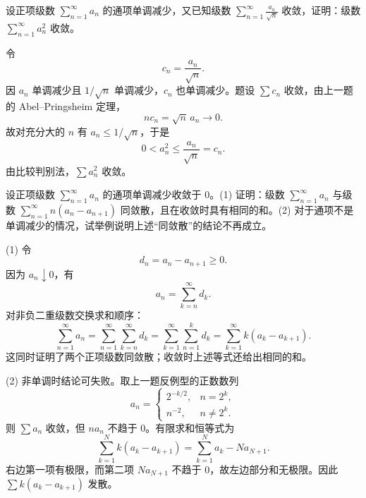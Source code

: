 \begin{xreferenceproblem}[3]
设正项级数 $\sum_{n=1}^{\infty}a_n$ 的通项单调减少，又已知级数 $\sum_{n=1}^{\infty}\frac{a_n}{\sqrt n}$ 收敛，证明：级数 $\sum_{n=1}^{\infty}a_n^2$ 收敛。
\end{xreferenceproblem}
\begin{xsolution}
令
\[
 c_n=\frac{a_n}{\sqrt n}.
\]
因 $a_n$ 单调减少且 $1/\sqrt n$ 单调减少，$c_n$ 也单调减少。题设 $\sum c_n$ 收敛，由上一题的 Abel--Pringsheim 定理，
\[
 nc_n=\sqrt n\,a_n\longrightarrow0.
\]
故对充分大的 $n$ 有 $a_n\leq1/\sqrt n$，于是
\[
 0<a_n^2\leq\frac{a_n}{\sqrt n}=c_n.
\]
由比较判别法，$\sum a_n^2$ 收敛。
\end{xsolution}


\begin{xreferenceproblem}[4]
设正项级数 $\sum_{n=1}^{\infty}a_n$ 的通项单调减少收敛于 0。(1) 证明：级数 $\sum_{n=1}^{\infty}a_n$ 与级数 $\sum_{n=1}^{\infty}n(a_n-a_{n+1})$ 同敛散，且在收敛时具有相同的和。(2) 对于通项不是单调减少的情况，试举例说明上述“同敛散”的结论不再成立。
\end{xreferenceproblem}
\begin{xsolution}
(1) 令
\[
 d_n=a_n-a_{n+1}\geq0.
\]
因为 $a_n\downarrow0$，有
\[
 a_n=\sum_{k=n}^{\infty}d_k.
\]
对非负二重级数交换求和顺序：
\[
 \sum_{n=1}^{\infty}a_n
 =\sum_{n=1}^{\infty}\sum_{k=n}^{\infty}d_k
 =\sum_{k=1}^{\infty}\sum_{n=1}^{k}d_k
 =\sum_{k=1}^{\infty}k(a_k-a_{k+1}).
\]
这同时证明了两个正项级数同敛散；收敛时上述等式还给出相同的和。

(2) 非单调时结论可失败。取上一题反例型的正数数列
\[
 a_n=\begin{cases}
 2^{-k/2},&n=2^k,\\
 n^{-2},&n\neq2^k.
 \end{cases}
\]
则 $\sum a_n$ 收敛，但 $na_n$ 不趋于 $0$。有限求和恒等式为
\[
 \sum_{k=1}^{N}k(a_k-a_{k+1})
 =\sum_{k=1}^{N}a_k-Na_{N+1}.
\]
右边第一项有极限，而第二项 $Na_{N+1}$ 不趋于 $0$，故左边部分和无极限。因此 $\sum k(a_k-a_{k+1})$ 发散。
\end{xsolution}


